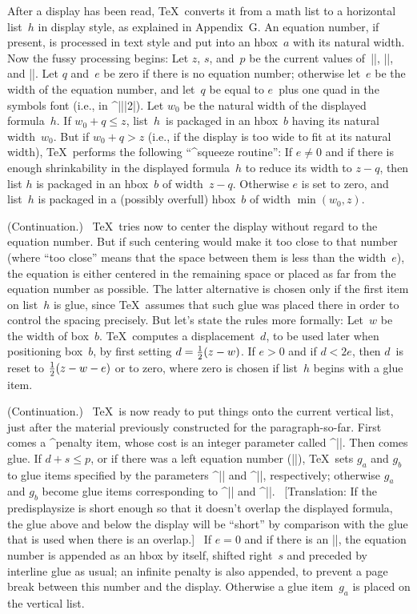 \ddanger After a display has been read, \TeX\ converts it from a math list
to a horizontal list~$h$ in display style, as explained in
Appendix~G\null.  An equation number, if present, is processed in text
style and put into an hbox~$a$ with its natural width. Now the fussy
processing begins: Let $z$, $s$, and~$p$ be the current values of\/\
|\displaywidth|, |\displayindent|, and
|\predisplaysize|. Let $q$ and~$e$ be zero if there is no equation
number; otherwise let~$e$ be the width of the equation number, and let~$q$
be equal to $e$~plus one quad in the symbols font (i.e., in
^|\textfont||2|). Let $w_0$ be the natural width of the displayed
formula~$h$. If $w_0+q\le z$, list~$h$~is packaged in an hbox~$b$ having
its natural width~$w_0$.  But if $w_0+q>z$ (i.e., if the display is too
wide to fit at its natural width), \TeX\ performs the following ``^{squeeze
routine}'':  If $e\ne0$ and if there is enough shrinkability in the
displayed formula~$h$ to reduce its width to $z-q$, then list $h$ is
packaged in an hbox~$b$ of width~$z-q$. Otherwise $e$ is set to zero, and
list~$h$ is packaged in a (possibly overfull) hbox~$b$ of width $\min(w_0,z)$.

\ddanger (Continuation.) \ \TeX\ tries now to center the display without
regard to the equation number. But if such centering would make it too close
to that number (where ``too close'' means that the space between them is less
than the width~$e$), the equation is either centered in the remaining space
or placed as far from the equation number as possible. The latter alternative
is chosen only if the first item on list~$h$ is glue, since \TeX\ assumes that
such glue was placed there in order to control the spacing precisely.
But let's state the rules more formally: Let~$w$ be the width of box~$b$.
\TeX\ computes a displacement~$d$, to be used later when positioning box~$b$,
by first setting $d={1\over2}(z-w)$. If $e>0$ and if $d<2e$, then $d$~is
reset to ${1\over2}(z-w-e)$ or to zero, where zero is chosen if list~$h$
begins with a glue item.

\ddanger (Continuation.) \ \TeX\ is now ready to put things onto the current
vertical list, just after the material previously constructed for the
paragraph-so-far. First comes a ^{penalty} item, whose cost is an integer
parameter called ^|\predisplaypenalty|. Then comes glue. If $d+s\le p$,
or if there was a left equation number (|\leqno|), \TeX\ sets $g_a$ and
$g_b$ to glue items specified by the parameters ^|\abovedisplayskip|
and ^|\belowdisplayskip|, respectively; otherwise $g_a$ and $g_b$ become
glue items corresponding to ^|\abovedisplayshortskip| and
^|\belowdisplayshortskip|. \ [Translation: If the predisplaysize is short
enough so that it doesn't overlap the displayed formula, the glue above and
below the display will be ``short'' by comparison with the glue that is
used when there is an overlap.] \ If $e=0$ and if there is an |\leqno|,
the equation number is appended as an hbox by itself, shifted right~$s$ and
preceded by interline glue as usual; an infinite penalty is also appended,
to prevent a page break between this number and the display. Otherwise
a glue item~$g_a$ is placed on the vertical list.

